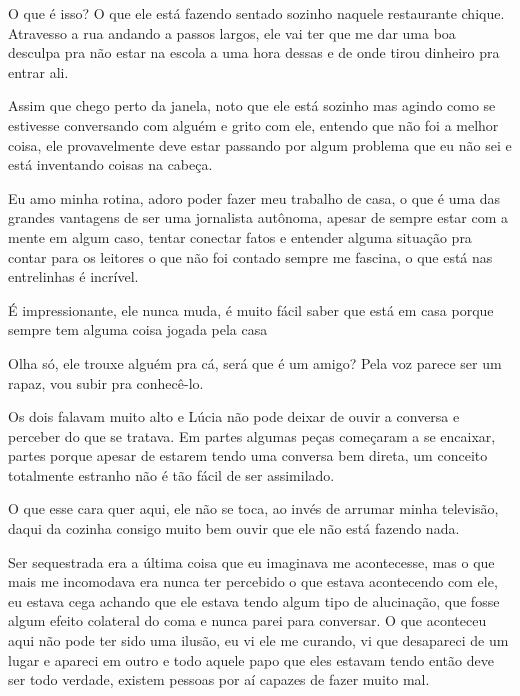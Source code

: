 O que é isso? O que ele está fazendo sentado sozinho naquele restaurante chique. Atravesso a rua andando a passos largos, ele vai ter que me dar uma boa desculpa pra não estar na escola a uma hora dessas e de onde tirou dinheiro pra entrar ali.

Assim que chego perto da janela, noto que ele está sozinho mas agindo como se estivesse conversando com alguém e grito com ele, entendo que não foi a melhor coisa, ele provavelmente deve estar passando por algum problema que eu não sei e está inventando coisas na cabeça.


Eu amo minha rotina, adoro poder fazer meu trabalho de casa, o que é uma das grandes vantagens de ser uma jornalista autônoma, apesar de sempre estar com a mente em algum caso, tentar conectar fatos e entender alguma situação pra contar para os leitores o que não foi contado sempre me fascina, o que está nas entrelinhas é incrível.


É impressionante, ele nunca muda, é muito fácil saber que está em casa porque sempre tem alguma coisa jogada pela casa

Olha só, ele trouxe alguém pra cá, será que é um amigo? Pela voz parece ser um rapaz, vou subir pra conhecê-lo.

Os dois falavam muito alto e Lúcia não pode deixar de ouvir a conversa e perceber do que se tratava. Em partes algumas peças começaram a se encaixar, partes porque apesar de estarem tendo uma conversa bem direta, um conceito totalmente estranho não é tão fácil de ser assimilado.


O que esse cara quer aqui, ele não se toca, ao invés de arrumar minha televisão, daqui da cozinha consigo muito bem ouvir que ele não está fazendo nada.


Ser sequestrada era a última coisa que eu imaginava me acontecesse, mas o que mais me incomodava era nunca ter percebido o que estava acontecendo com ele, eu estava cega achando que ele estava tendo algum tipo de alucinação, que fosse algum efeito colateral do coma e nunca parei para conversar. O que aconteceu aqui não pode ter sido uma ilusão, eu vi ele me curando, vi que desapareci de um lugar e apareci em outro e todo aquele papo que eles estavam tendo então deve ser todo verdade, existem pessoas por aí capazes de fazer muito mal.

